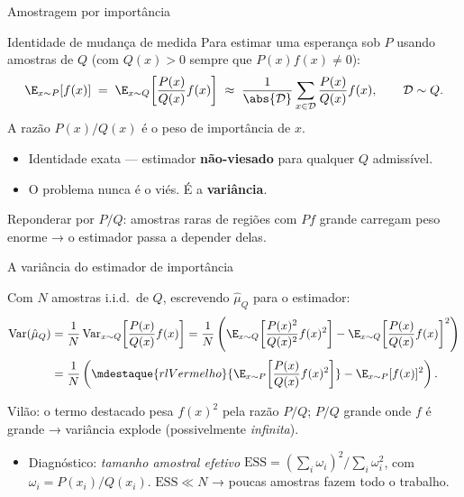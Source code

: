 \documentclass[aspectratio=169, 10pt]{beamer}
\newcommand{\Var}{\operatorname{Var}}
\newcommand{\Dtot}{\mathcal{D}}
\begin{document}
\begin{frame}{Amostragem por importância}

  \begin{defbox}{Identidade de mudança de medida}
    Para estimar uma esperança sob $P$ usando amostras de $Q$ (com $Q(x)>0$ sempre
    que $P(x)f(x)\neq 0$):
    \[
      \E_{x\sim P}[f(x)] \;=\; \E_{x\sim Q}\!\left[\frac{P(x)}{Q(x)} f(x)\right]
      \;\approx\; \frac{1}{\abs{\Dtot}}\sum_{x\in\Dtot}\frac{P(x)}{Q(x)} f(x),
      \qquad \Dtot \sim Q .
    \]
    A razão $P(x)/Q(x)$ é o \alert{peso de importância} de $x$.
  \end{defbox}

  \begin{itemize}
    \item Identidade exata --- estimador \textbf{não-viesado} para qualquer $Q$
      admissível.
    \item O problema nunca é o viés. É a \textbf{variância}.
  \end{itemize}

  \begin{ideiabox}
    Reponderar por $P/Q$: amostras raras de regiões com $Pf$ grande carregam peso
    enorme → o estimador passa a depender delas.
  \end{ideiabox}
\end{frame}

\begin{frame}{A variância do estimador de importância}

  Com $N$ amostras i.i.d.\ de $Q$, escrevendo $\hat\mu_Q$ para o estimador:
  \begin{align*}
    \Var(\hat\mu_Q)
      &= \frac{1}{N}\Var_{x\sim Q}\!\left[\frac{P(x)}{Q(x)}f(x)\right]
       = \frac{1}{N}\left(
          \E_{x\sim Q}\!\left[\frac{P(x)^2}{Q(x)^2}f(x)^2\right]
          - \E_{x\sim Q}\!\left[\frac{P(x)}{Q(x)}f(x)\right]^{2}\right)\\[0.3em]
      &= \frac{1}{N}\left(
          \mdestaque{rlVermelho}{\E_{x\sim P}\!\left[\frac{P(x)}{Q(x)}f(x)^2\right]}
          - \E_{x\sim P}[f(x)]^{2}\right).
  \end{align*}

  \begin{alertabox}
    Vilão: o termo destacado pesa $f(x)^2$ pela razão $P/Q$; $P/Q$ grande onde $f$
    é grande → variância explode (possivelmente \emph{infinita}).
  \end{alertabox}

  \begin{itemize}
    \item Diagnóstico: \emph{tamanho amostral efetivo}
      $\mathrm{ESS} = (\sum_i \omega_i)^2 / \sum_i \omega_i^2$, com $\omega_i = P(x_i)/Q(x_i)$.
      $\mathrm{ESS} \ll N$ → poucas amostras fazem todo o trabalho.
  \end{itemize}
\end{frame}
\end{document}
